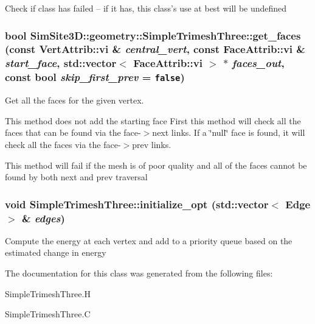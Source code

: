 Check if class has failed -- if it has, this class's use at best will be undefined 
\subsubsection{\setlength{\rightskip}{0pt plus 5cm}bool SimSite3D::geometry::Simple\-Trimesh\-Three::get\_\-faces (const \bf{Vert\-Attrib::vi} \& {\em central\_\-vert}, const \bf{Face\-Attrib::vi} \& {\em start\_\-face}, std::vector$<$ \bf{Face\-Attrib::vi} $>$ $\ast$ {\em faces\_\-out}, const bool {\em skip\_\-first\_\-prev} = {\tt false})\hspace{0.3cm}{\tt  [inline, private]}}\label{classSimSite3D_1_1geometry_1_1SimpleTrimeshThree_f9a5290c66ae41e3683ca5a6c25ef0da}


Get all the faces for the given vertex. 

This method does not add the starting face First this method will check all the faces that can be found via the face-$>$next links. If a \char`\"{}null\char`\"{} face is found, it will check all the faces via the face-$>$prev links.

This method will fail if the mesh is of poor quality and all of the faces cannot be found by both next and prev traversal 
\subsubsection{\setlength{\rightskip}{0pt plus 5cm}void Simple\-Trimesh\-Three::initialize\_\-opt (std::vector$<$ Edge $>$ \& {\em edges})}\label{classSimSite3D_1_1geometry_1_1SimpleTrimeshThree_788fe4d23d6d07ffc06b1d2bbd2128d2}


Compute the energy at each vertex and add to a priority queue based on the estimated change in energy 

The documentation for this class was generated from the following files:\begin{CompactItemize}
\item 
Simple\-Trimesh\-Three.H\item 
Simple\-Trimesh\-Three.C\end{CompactItemize}
